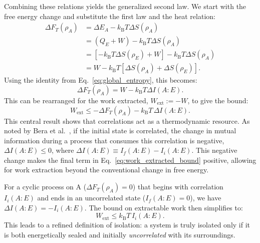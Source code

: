 \documentclass[%
  reprint,
  showpacs,
  showkeys,
  pra,
  longbibliography,
  floatfix,
  x11names
]{revtex4-2}
\begin{document}
Combining these relations yields the generalized second law. We start with the free energy change and substitute the first law and the heat relation:
\begin{align}
\Delta F_T(\rho_A) &= \Delta E_A - k_{\mathrm{B}} T \Delta S(\rho_A) \nonumber \\
&= (Q_E + W) - k_{\mathrm{B}} T \Delta S(\rho_A) \nonumber \\
&= \left[-k_{\mathrm{B}}T \Delta S(\rho_E) + W\right] - k_{\mathrm{B}} T \Delta S(\rho_A) \nonumber \\
&= W - k_{\mathrm{B}}T\left[\Delta S(\rho_A) + \Delta S(\rho_E)\right].
\end{align}
Using the identity from Eq.~\eqref{eq:global_entropy}, this becomes:
\begin{equation}
\Delta F_T(\rho_A) = W - k_{\mathrm{B}}T \Delta I(A:E).
\end{equation}
This can be rearranged for the work extracted, $W_{\mathrm{ext}} := -W$, to give the bound:
\begin{equation}
W_{\mathrm{ext}} \le -\Delta F_T(\rho_A) - k_{\mathrm{B}} T\,\Delta I(A:E).
\label{eq:work_extracted_bound}
\end{equation}
This central result shows that correlations act as a thermodynamic resource. As noted by Bera et al.~\cite{Bera2017a}, if the initial state is correlated, the change in mutual information during a process that consumes this correlation is negative, $\Delta I(A:E) \le 0$, where $\Delta I(A:E) \equiv I_f(A:E) - I_i(A:E)$. This negative change makes the final term in Eq.~\eqref{eq:work_extracted_bound} positive, allowing for work extraction beyond the conventional change in free energy.

For a cyclic process on A ($\Delta F_T(\rho_A)=0$) that begins with correlation $I_i(A:E)$ and ends in an uncorrelated state ($I_f(A:E)=0$), we have $\Delta I(A:E) = -I_i(A:E)$. The bound on extractable work then simplifies to:
\begin{equation}
W_{\mathrm{ext}} \le k_{\mathrm{B}} T\, I_i(A:E).
\label{eq:work_from_I}
\end{equation}
This leads to a refined definition of isolation: a system is truly isolated only if it is both energetically sealed and initially \emph{uncorrelated} with its surroundings.
\end{document}
